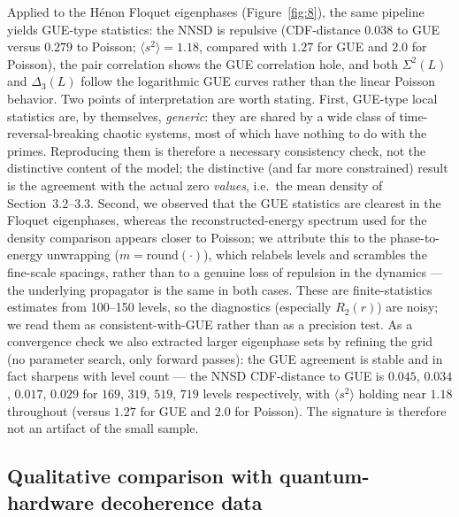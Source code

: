 \documentclass[11pt]{article}
\begin{document}
Applied to the Hénon Floquet eigenphases (Figure~\ref{fig:8}), the same pipeline yields GUE-type statistics: the NNSD is repulsive (CDF-distance $0.038$ to GUE versus $0.279$ to Poisson; $\langle s^2\rangle = 1.18$, compared with $1.27$ for GUE and $2.0$ for Poisson), the pair correlation shows the GUE correlation hole, and both $\Sigma^2(L)$ and $\Delta_3(L)$ follow the logarithmic GUE curves rather than the linear Poisson behavior. Two points of interpretation are worth stating. First, GUE-type local statistics are, by themselves, \emph{generic}: they are shared by a wide class of time-reversal-breaking chaotic systems, most of which have nothing to do with the primes. Reproducing them is therefore a necessary consistency check, not the distinctive content of the model; the distinctive (and far more constrained) result is the agreement with the actual zero \emph{values}, i.e.\ the mean density of Section~3.2--3.3. Second, we observed that the GUE statistics are clearest in the Floquet eigenphases, whereas the reconstructed-energy spectrum used for the density comparison appears closer to Poisson; we attribute this to the phase-to-energy unwrapping ($m=\mathrm{round}(\cdot)$), which relabels levels and scrambles the fine-scale spacings, rather than to a genuine loss of repulsion in the dynamics --- the underlying propagator is the same in both cases. These are finite-statistics estimates from 100--150 levels, so the diagnostics (especially $R_2(r)$) are noisy; we read them as consistent-with-GUE rather than as a precision test. As a convergence check we also extracted larger eigenphase sets by refining the grid (no parameter search, only forward passes): the GUE agreement is stable and in fact sharpens with level count --- the NNSD CDF-distance to GUE is $0.045$, $0.034$, $0.017$, $0.029$ for $169$, $319$, $519$, $719$ levels respectively, with $\langle s^2\rangle$ holding near $1.18$ throughout (versus $1.27$ for GUE and $2.0$ for Poisson). The signature is therefore not an artifact of the small sample.

\subsection{Qualitative comparison with quantum-hardware decoherence data}
\end{document}
